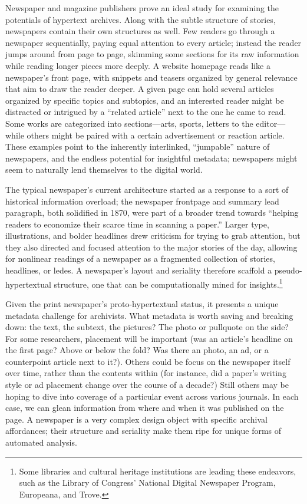Newspaper and magazine publishers prove an ideal study for examining the potentials of hypertext archives. Along with the subtle structure of stories, newspapers contain their own structures as well. Few readers go through a newspaper sequentially, paying equal attention to every article; instead the reader jumps around from page to page, skimming some sections for its raw information while reading longer pieces more deeply. A website homepage reads like a newspaper's front page, with snippets and teasers organized by general relevance that aim to draw the reader deeper. A given page can hold several articles organized by specific topics and subtopics, and an interested reader might be distracted or intrigued by a ``related article'' next to the one he came to read. Some works are categorized into sections---arts, sports, letters to the editor---while others might be paired with a certain advertisement or reaction article. These examples point to the inherently interlinked, ``jumpable'' nature of newspapers, and the endless potential for insightful metadata; newspapers might seem to naturally lend themselves to the digital world.

The typical newspaper's current architecture started as a response to a sort of historical information overload; the newspaper frontpage and summary lead paragraph, both solidified in 1870, were part of a broader trend towards ``helping readers to economize their scarce time in scanning a paper.''\autocite[254]{starr_creation_2004} Larger type, illustrations, and bolder headlines drew criticism for trying to grab attention, but they also directed and focused attention to the major stories of the day, allowing for nonlinear readings of a newspaper as a fragmented collection of stories, headlines, or ledes. A newspaper's layout and seriality therefore scaffold a pseudo-hypertextual structure, one that can be computationally mined for insights.\footnote{Some libraries and cultural heritage institutions are leading these endeavors, such as the Library of Congress' National Digital Newspaper Program, Europeana, and Trove.}

Given the print newspaper's proto-hypertextual status, it presents a unique metadata challenge for archivists. What metadata is worth saving and breaking down: the text, the subtext, the pictures? The photo or pullquote on the side? For some researchers, placement will be important (was an article's headline on the first page? Above or below the fold? Was there an photo, an ad, or a counterpoint article next to it?). Others could be focus on the newspaper itself over time, rather than the contents within (for instance, did a paper's writing style or ad placement change over the course of a decade?) Still others may be hoping to dive into coverage of a particular event across various journals. In each case, we can glean information from where and when it was published on the page. A newspaper is a very complex design object with specific archival affordances; their structure and seriality make them ripe for unique forms of automated analysis.

